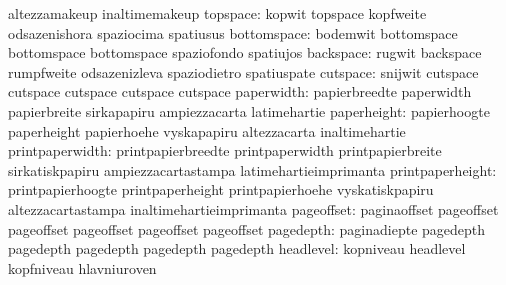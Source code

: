                                   altezzamakeup                    inaltimemakeup
                        topspace: kopwit                           topspace
                                  kopfweite                        odsazenishora
                                  spaziocima                       spatiusus
                     bottomspace: bodemwit                         bottomspace
                                  bottomspace                      bottomspace
                                  spaziofondo                      spatiujos
                       backspace: rugwit                           backspace
                                  rumpfweite                       odsazenizleva
                                  spaziodietro                     spatiuspate %
                        cutspace: snijwit                          cutspace
                                  cutspace                         cutspace
                                  cutspace                         cutspace %
                      paperwidth: papierbreedte                    paperwidth
                                  papierbreite                     sirkapapiru
                                  ampiezzacarta                    latimehartie
                     paperheight: papierhoogte                     paperheight
                                  papierhoehe                      vyskapapiru
                                  altezzacarta                     inaltimehartie
                 printpaperwidth: printpapierbreedte               printpaperwidth
                                  printpapierbreite                sirkatiskpapiru
                                  ampiezzacartastampa              latimehartieimprimanta %
                printpaperheight: printpapierhoogte                printpaperheight
                                  printpapierhoehe                 vyskatiskpapiru
                                  altezzacartastampa               inaltimehartieimprimanta  %
                      pageoffset: paginaoffset                     pageoffset
                                  pageoffset                       pageoffset
                                  pageoffset                       pageoffset
                       pagedepth: paginadiepte                     pagedepth
                                  pagedepth                        pagedepth
                                  pagedepth                        pagedepth
                       headlevel: kopniveau                        headlevel
                                  kopfniveau                       hlavniuroven
